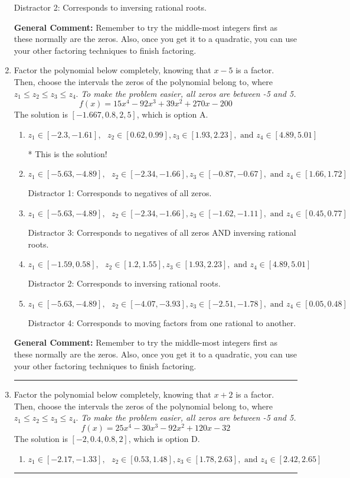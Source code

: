 \documentclass{extbook}[14pt]
\newcommand{\litem}[1]{\item #1

\rule{\textwidth}{0.4pt}}
\begin{document}
\begin{enumerate}
{\begin{enumerate}[label=\Alph*.]
 Distractor 2: Corresponds to inversing rational roots.
\end{enumerate}

\textbf{General Comment:} Remember to try the middle-most integers first as these normally are the zeros. Also, once you get it to a quadratic, you can use your other factoring techniques to finish factoring.
}
\litem{
Factor the polynomial below completely, knowing that $x -5$ is a factor. Then, choose the intervals the zeros of the polynomial belong to, where $z_1 \leq z_2 \leq z_3 \leq z_4$. \textit{To make the problem easier, all zeros are between -5 and 5.}
\[ f(x) = 15x^{4} -92 x^{3} +39 x^{2} +270 x -200 \]The solution is \( [-1.667, 0.8, 2, 5] \), which is option A.\begin{enumerate}[label=\Alph*.]
\item \( z_1 \in [-2.3, -1.61], \text{   }  z_2 \in [0.62, 0.99], z_3 \in [1.93, 2.23], \text{   and   } z_4 \in [4.89, 5.01] \)

* This is the solution!
\item \( z_1 \in [-5.63, -4.89], \text{   }  z_2 \in [-2.34, -1.66], z_3 \in [-0.87, -0.67], \text{   and   } z_4 \in [1.66, 1.72] \)

 Distractor 1: Corresponds to negatives of all zeros.
\item \( z_1 \in [-5.63, -4.89], \text{   }  z_2 \in [-2.34, -1.66], z_3 \in [-1.62, -1.11], \text{   and   } z_4 \in [0.45, 0.77] \)

 Distractor 3: Corresponds to negatives of all zeros AND inversing rational roots.
\item \( z_1 \in [-1.59, 0.58], \text{   }  z_2 \in [1.2, 1.55], z_3 \in [1.93, 2.23], \text{   and   } z_4 \in [4.89, 5.01] \)

 Distractor 2: Corresponds to inversing rational roots.
\item \( z_1 \in [-5.63, -4.89], \text{   }  z_2 \in [-4.07, -3.93], z_3 \in [-2.51, -1.78], \text{   and   } z_4 \in [0.05, 0.48] \)

 Distractor 4: Corresponds to moving factors from one rational to another.
\end{enumerate}

\textbf{General Comment:} Remember to try the middle-most integers first as these normally are the zeros. Also, once you get it to a quadratic, you can use your other factoring techniques to finish factoring.
}
\litem{
Factor the polynomial below completely, knowing that $x + 2$ is a factor. Then, choose the intervals the zeros of the polynomial belong to, where $z_1 \leq z_2 \leq z_3 \leq z_4$. \textit{To make the problem easier, all zeros are between -5 and 5.}
\[ f(x) = 25x^{4} -30 x^{3} -92 x^{2} +120 x -32 \]The solution is \( [-2, 0.4, 0.8, 2] \), which is option D.\begin{enumerate}[label=\Alph*.]
\item \( z_1 \in [-2.17, -1.33], \text{   }  z_2 \in [0.53, 1.48], z_3 \in [1.78, 2.63], \text{   and   } z_4 \in [2.42, 2.65] \)


\end{enumerate}}
\end{enumerate}
\end{document}
